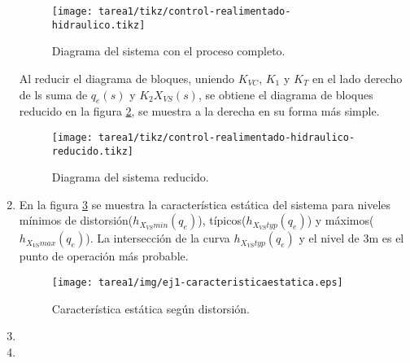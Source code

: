 \begin{ejercicio}
\begin{enumerate}
    \begin{figure}[H]
      \centering
      \texttt{[image: tarea1/tikz/control-realimentado-hidraulico.tikz]}
      \caption{Diagrama del sistema con el proceso completo.}
      \label{ej1:diag1}
    \end{figure}

    Al reducir el diagrama de bloques, uniendo $K_{VC}$, $K_1$ y $K_T$ en el lado derecho de ls suma de $q_e(s)$ y $K_2 X_{VS}(s)$, se obtiene el diagrama de bloques reducido en la figura \ref{ej1:diag2}, se muestra a la derecha en su forma más simple.  

   \begin{figure}[H]
    \centering
      \texttt{[image: tarea1/tikz/control-realimentado-hidraulico-reducido.tikz]}
      \caption{Diagrama del sistema reducido.}
      \label{ej1:diag2}
    \end{figure}

    \item %
    En la figura \ref{ej1:img1} se muestra la característica estática del sistema para niveles mínimos de distorsión($h_{X_{VS}min}(q_e)$), típicos($h_{X_{VS}typ}(q_e)$) y máximos($h_{X_{VS}max}(q_e)$). La intersección de la curva $h_{X_{VS}typ}(q_e)$ y el nivel de 3m es el punto de operación más probable. 
    \begin{figure}[H]
      \centering
      \texttt{[image: tarea1/img/ej1-caracteristicaestatica.eps]}
      \caption{Característica estática según distorsión.}
      \label{ej1:img1}
    \end{figure}


    \item %

    \item %
    
  \end{enumerate}

\end{ejercicio}